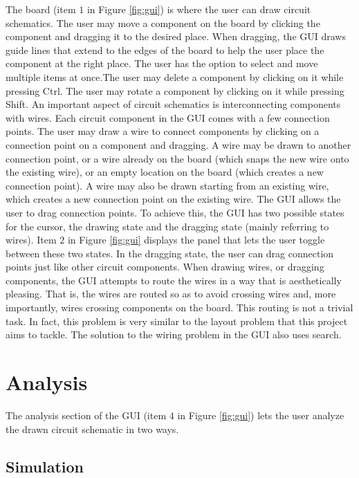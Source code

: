 The board (item $1$ in Figure \ref{fig:gui}) is where the user can draw circuit
schematics. The user may move a component on the board by clicking the component
and dragging it to the desired place. When dragging, the GUI draws guide lines
that extend to the edges of the board to help the user place the component
at the right place. The user has the option to select and move multiple items at
once.The user may delete a component by clicking on it while
pressing Ctrl. The user may rotate a component by clicking on it
while pressing Shift. An important aspect of circuit schematics is
interconnecting components with wires. Each circuit component in the GUI comes
with a few connection points. The user may draw a wire to connect
components by clicking on a connection point on a component and dragging.
A wire may be drawn to another connection
point, or a wire already on the board (which snaps the new wire onto the
existing wire), or an empty location on the board (which creates a new
connection point). A wire may also be drawn starting from an existing wire,
which creates a new connection point on the existing wire. The GUI allows the
user to drag connection points. To achieve this, the GUI has two possible
states for the cursor, the drawing state and the dragging state (mainly
referring to wires). Item $2$ in Figure \ref{fig:gui} displays the panel that
lets the user toggle between these two states. In the dragging state, the user
can drag connection points just like other circuit components.
When drawing wires, or dragging components,
the GUI attempts to route the wires in a way that is aesthetically pleasing.
That is, the wires are routed so as to avoid crossing wires and,
more importantly,
wires crossing components on the board. This routing is not a trivial
task. In fact, this problem is very similar to the layout problem that this
project aims to tackle. The solution to the wiring problem in the GUI also uses
search.

\section{Analysis}

The analysis section of the GUI (item $4$ in Figure \ref{fig:gui}) lets the user
analyze the drawn circuit schematic in two ways.

\subsection{Simulation}

